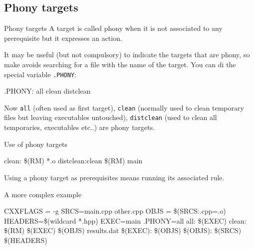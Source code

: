 \documentclass[10pt,aspectratio=169]{beamer}
\begin{document}
\subsection*{Phony targets}
\begin{frame}{Phony targets}
A target is called \alert{phony} when it is not associated to any prerequisite but it expresses an \alert{action}.

It may be useful (but not compulsory) to indicate the targets that are phony, so
make avoids searching for a file with the name of the target. You can di 
the \alert{special variable} \texttt{.PHONY}:

\begin{semiverbatim}
.PHONY: all clean distclean\newline
\end{semiverbatim}
\vspace*{-0.3cm}
Now \texttt{all} (often used as first target), \texttt{clean} (normally used to clean temporary files but leaving executables untouched), \texttt{distclean} (used to clean all temporaries, executables etc..) are phony targets.
\end{frame}

\begin{frame}{Use of phony targets}

\begin{semiverbatim}
clean:\newline
\phantom{xx} \$(RM) *.o\newline
distclean:clean\newline
\phantom{xx} \$(RM) main
\end{semiverbatim}
\vspace*{-0.3cm}
Using a phony target as prerequisites means \alert{running its associated rule}. 

\end{frame}

\begin{frame}{A more complex example}
\begin{semiverbatim}
CXXFLAGS = -g\newline
SRCS=main.cpp other.cpp\newline
OBJS = \$(SRCS:.cpp=.o)\newline
HEADERS=\$(wildcard *.hpp)\newline
EXEC=main\newline
.PHONY=all\newline
all: \$(EXEC)\newline
clean:\newline
\phantom{xx} \$(RM) \$(EXEC) \$(OBJS) results.dat\newline
\$(EXEC): \$(OBJS)\newline
\$(OBJS): \$(SRCS) \$(HEADERS)
\end{semiverbatim}
\end{frame}
\end{document}

